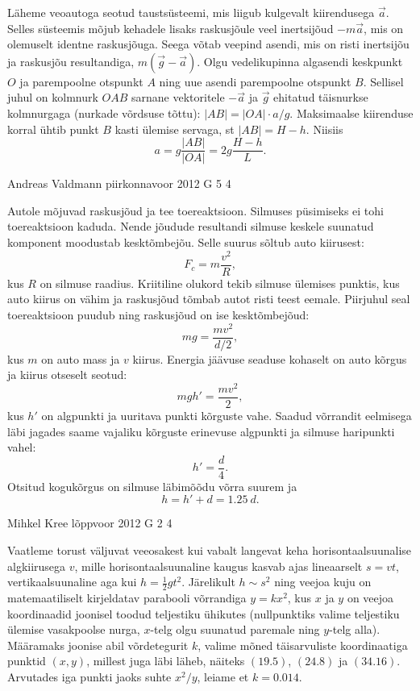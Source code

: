 \documentclass[11pt]{article}
\begin{document}
{{\ifSolution
Läheme veoautoga seotud taustsüsteemi, mis liigub kulgevalt kiirendusega $\vec a$. Selles süsteemis mõjub
kehadele lisaks raskusjõule veel inertsijõud $-m\vec a$, mis on olemuselt identne raskusjõuga.
Seega võtab veepind asendi, mis on risti inertsijõu ja raskusjõu resultandiga, $m(\vec g-\vec a)$.
Olgu vedelikupinna algasendi keskpunkt $O$ ja parempoolne otspunkt $A$ ning uue asendi parempoolne otspunkt $B$.
Sellisel juhul on kolmnurk $OAB$ sarnane vektoritele $-\vec a$ ja $\vec g$ ehitatud täisnurkse kolmnurgaga (nurkade võrdsuse tõttu):
$|AB|=|OA|\cdot a/g$. Maksimaalse kiirenduse korral ühtib punkt $B$ kasti ülemise servaga, st $|AB|=H-h$. Niisiis
\[
a=g\frac{|AB|}{|OA|}=2g\frac {H-h}{L}.
\]
\fi
}

{Andreas Valdmann} %
{piirkonnavoor} %
{2012} %
{G 5} %
{4} %
{

\ifSolution
Autole mõjuvad raskusjõud ja tee toereaktsioon. Silmuses püsimiseks ei tohi
toereaktsioon kaduda. Nende jõudude resultandi silmuse keskele
suunatud komponent moodustab kesktõmbejõu. Selle suurus sõltub auto kiirusest:
\[F_c=m\frac{v^2}{R},\]
kus $R$ on silmuse raadius.
Kriitiline olukord tekib silmuse ülemises punktis, kus auto kiirus on vähim ja
raskusjõud tõmbab autot risti teest eemale. Piirjuhul seal
toereaktsioon puudub ning raskusjõud on ise kesktõmbejõud:
\[ mg=\frac{mv^2}{d/2},\]
kus $m$ on auto mass ja $v$ kiirus.
Energia jäävuse seaduse kohaselt on auto kõrgus ja kiirus otseselt seotud:
\[ mgh'=\frac{mv^2}{2},\]
kus $h'$ on algpunkti ja uuritava punkti kõrguste vahe. Saadud võrrandit 
eelmisega läbi jagades saame vajaliku kõrguste erinevuse algpunkti ja silmuse 
haripunkti vahel:
\[ h'=\frac{d}{4}.\]
Otsitud kogukõrgus on silmuse läbimõõdu võrra suurem ja
\[ h=h'+d=\SI{1,25}{d}.\]
\fi
}

{Mihkel Kree} %
{lõppvoor} %
{2012} %
{G 2} %
{4} %
{

\ifSolution
Vaatleme torust väljuvat veeosakest kui vabalt langevat keha horisontaalsuunalise algkiirusega $v$, mille horisontaalsuunaline kaugus kasvab ajas lineaarselt $s=vt$, vertikaalsuunaline aga kui $h=\frac{1}{2}gt^2$. Järelikult $h\sim s^2$ ning veejoa kuju on matemaatiliselt kirjeldatav parabooli võrrandiga $y=kx^2$, kus $x$ ja $y$ on veejoa koordinaadid joonisel toodud teljestiku ühikutes (nullpunktiks valime teljestiku ülemise vasakpoolse nurga, $x$-telg olgu suunatud paremale ning $y$-telg alla). Määramaks joonise abil võrdetegurit $k$, valime mõned täisarvuliste koordinaatiga punktid $(x,y)$, millest juga läbi läheb, näiteks $(\num{19,5})$, $(\num{24,8})$ ja $(\num{34,16})$. Arvutades iga punkti jaoks suhte $x^2/y$, leiame et $k=\num{0.014}$. 
	
}}
\end{document}
